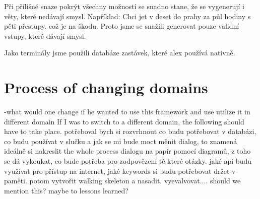 Při přílišné snaze pokrýt všechny možností se snadno stane, že se vygenerují i věty, které nedávají smysl. Například: Chci jet v deset do prahy za půl hodiny s pěti přestupy. což je na škodu. Proto jsme se snažili generovat pouze validní vstupy, které dávají smysl.

Jako terminály jsme použili databáze zastávek, které alex používá nativně.


\section{Process of changing domains} 
  -what would one change if he wanted to use this framework and use utilize it in different domain
  If I was to switch to a different domain, the following should have to take place.
  potřeboval bych si rozvrhnout co budu potřebovat v databázi, co budu používat v slučku a jak se mi bude moct měnit dialog, to znamená ideálně si nakreslit the whole process dialogu na papír pomocí diagramů, z toho se dá vykoukat, co bude potřeba pro zodpovězení té které otázky. jaké api budu využívat pro přístup na internet, jaké keywords si budu potřebovat držet v paměti. potom vytvořit walking skeleton a nasadit. vyevalvovat....
  should we mention this? maybe to lessons learned?

  
